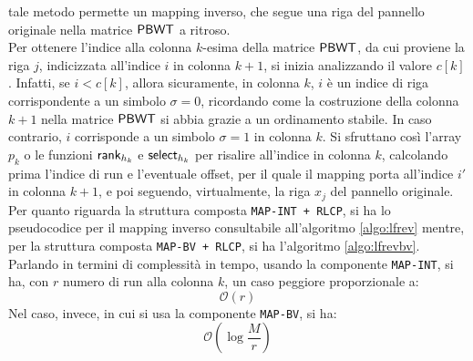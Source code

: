 tale metodo permette un mapping inverso, che segue una riga del
pannello originale nella matrice $\mbox{\rm {\sf PBWT}}$ a ritroso.\\ 
Per ottenere l'indice alla colonna $k$-esima della matrice $\mbox{\rm {\sf PBWT}}$, da cui
proviene la riga $j$, indicizzata all'indice $i$ in
colonna $k+1$, si inizia analizzando il valore
$c[k]$. Infatti, se $i<c[k]$, 
allora sicuramente, in colonna $k$, $i$ è un indice di riga corrispondente a
un simbolo
$\sigma=0$, ricordando come la costruzione della colonna $k+1$
nella matrice $\mbox{\rm {\sf PBWT}}$ si abbia grazie a un ordinamento stabile.
In caso contrario,
$i$ corrisponde a un simbolo $\sigma=1$ in colonna $k$.
Si sfruttano 
così l'array $p_k$ o le funzioni 
$\mbox{\rm {\sf rank}}_{h_k}$ e $\mbox{\rm {\sf select}}_{h_k}$ per risalire all'indice in colonna $k$,
calcolando 
prima l'indice di run e l'eventuale offset, per il quale il mapping porta
all'indice $i'$ in colonna $k+1$, e poi seguendo, virtualmente, la riga $x_j$
del pannello originale. 
Per quanto riguarda la struttura composta \texttt{MAP-INT + RLCP}, si ha lo
pseudocodice per il 
mapping inverso consultabile all'algoritmo \ref{algo:lfrev} mentre, per
la struttura composta \texttt{MAP-BV + RLCP}, si ha l'algoritmo
\ref{algo:lfrevbv}. Parlando in termini di complessità in tempo,
usando la componente \texttt{MAP-INT}, si ha, con $r$ numero di run alla
colonna $k$, un caso peggiore proporzionale a:
\begin{equation}
  \label{eq:revint}
  \mathcal{O}(r)
\end{equation}
Nel caso, invece, in cui si usa la componente \texttt{MAP-BV}, si ha:
\begin{equation}
  \label{eq:revbv}
  \mathcal{O}\left(\log\frac{M}{r}\right)
\end{equation}
